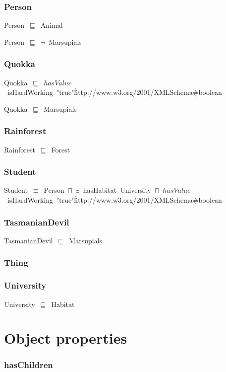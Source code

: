 \documentclass{article}
\begin{document}
\subsubsection*{Person}

Person~\ensuremath{\sqsubseteq}~Animal~

Person~\ensuremath{\sqsubseteq}~\ensuremath{\lnot}~Marsupials

\subsubsection*{Quokka}

Quokka~\ensuremath{\sqsubseteq}~\ensuremath{hasValue}~isHardWorking~"true"\^\^http://www.w3.org/2001/XMLSchema#boolean~

Quokka~\ensuremath{\sqsubseteq}~Marsupials~

\subsubsection*{Rainforest}

Rainforest~\ensuremath{\sqsubseteq}~Forest~

\subsubsection*{Student}

Student~\ensuremath{\equiv}~Person~\ensuremath{\sqcap}~\ensuremath{\exists}~hasHabitat~University~\ensuremath{\sqcap}~\ensuremath{hasValue}~isHardWorking~"true"\^\^http://www.w3.org/2001/XMLSchema#boolean

\subsubsection*{TasmanianDevil}

TasmanianDevil~\ensuremath{\sqsubseteq}~Marsupials~

\subsubsection*{Thing}

\subsubsection*{University}

University~\ensuremath{\sqsubseteq}~Habitat~

\section*{Object properties}\subsubsection*{hasChildren}
\end{document}
